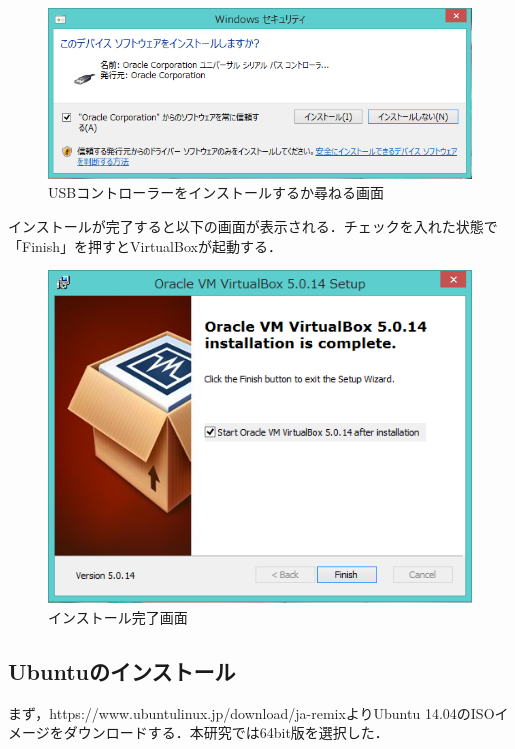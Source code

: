 \begin{figure}[H]
\centering
\includegraphics[width=13cm]{vboxinstall_device.PNG}
\caption{USBコントローラーをインストールするか尋ねる画面}\label{vboxinstalldevice}
\end{figure}

インストールが完了すると以下の画面が表示される．チェックを入れた状態で「Finish」を押すとVirtualBoxが起動する．

\begin{figure}[H]
\centering
\includegraphics[width=13cm]{vboxinstall_finish.PNG}
\caption{インストール完了画面}\label{vboxinstallfinish}
\end{figure}

\subsection{Ubuntuのインストール}
まず，https://www.ubuntulinux.jp/download/ja-remixよりUbuntu 14.04のISOイメージをダウンロードする．本研究では64bit版を選択した．

